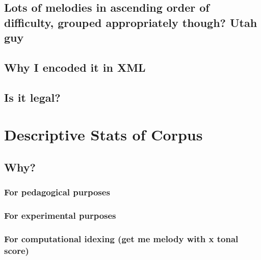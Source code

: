 \documentclass[]{book}
\theoremstyle{definition}
\theoremstyle{definition}
\theoremstyle{definition}
\theoremstyle{remark}
\begin{document}
\hypertarget{lots-of-melodies-in-ascending-order-of-difficulty-grouped-appropriately-though-utah-guy}{%
\subsection{Lots of melodies in ascending order of difficulty, grouped
appropriately though? Utah
guy}\label{lots-of-melodies-in-ascending-order-of-difficulty-grouped-appropriately-though-utah-guy}}

\hypertarget{why-i-encoded-it-in-xml}{%
\subsection{Why I encoded it in XML}\label{why-i-encoded-it-in-xml}}

\hypertarget{is-it-legal}{%
\subsection{Is it legal?}\label{is-it-legal}}

\hypertarget{descriptive-stats-of-corpus}{%
\section{Descriptive Stats of
Corpus}\label{descriptive-stats-of-corpus}}

\hypertarget{why}{%
\subsection{Why?}\label{why}}

\hypertarget{for-pedagogical-purposes}{%
\subsubsection{For pedagogical
purposes}\label{for-pedagogical-purposes}}

\hypertarget{for-experimental-purposes}{%
\subsubsection{For experimental
purposes}\label{for-experimental-purposes}}

\hypertarget{for-computational-idexing-get-me-melody-with-x-tonal-score}{%
\subsubsection{For computational idexing (get me melody with x tonal
score)}\label{for-computational-idexing-get-me-melody-with-x-tonal-score}}
\end{document}
